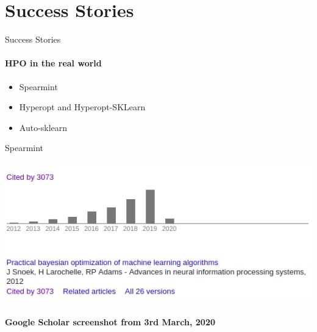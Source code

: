 \section{Success Stories}
\begin{frame}[c]{Success Stories}
\framesubtitle{HPO in the real world}
\begin{itemize}
    \item Spearmint
    \item Hyperopt and Hyperopt-SKLearn
    \item Auto-sklearn
\end{itemize}

\end{frame}
\begin{frame}[c]{Spearmint}
\pause
\begin{center}
    \includegraphics[width=.9\linewidth, height=0.9\textheight, keepaspectratio=true]{images/success_stories/spearmint_alt_stats.png}
    \newline \paragraph{Google Scholar screenshot from 3rd March, 2020}
\end{center}
\end{frame}
